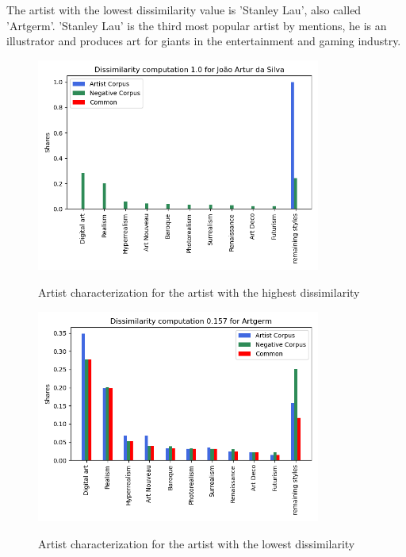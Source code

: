 The artist with the lowest dissimilarity value is 'Stanley Lau', also called 'Artgerm'. 'Stanley Lau' is the third most popular artist by mentions, he is an illustrator and produces art for giants in the entertainment and gaming industry.

\begin{figure}[h]
    \begin{center}
        \includegraphics[height=7cm]{Bilder/artist_highest_dissimilarity.png}\\[2.5ex]
    \end{center}
\caption{Artist characterization for the artist with the highest dissimilarity}
\end{figure}

\begin{figure}[h]
    \begin{center}
        \includegraphics[height=7cm]{Bilder/artist_lowest_dissimilarity.png}\\[2.5ex]
    \end{center}
\caption{Artist characterization for the artist with the lowest dissimilarity}
\label{fig:lowest_dissimilarity}
\end{figure}



